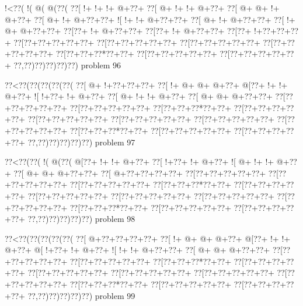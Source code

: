 \vbox{\vbox{\goo
\- !<\0??(\- !(\- @(\- @(\0??(
\0??[\- !+\- !+\- !+\- @+\0??+
\0??[\- @+\- !+\- !+\- @+\0??+
\0??[\- @+\- @+\- !+\- @+\0??+
\0??[\- @+\- !+\- @+\0??+\0??+
\- ![\- !+\- !+\- @+\0??+\0??+
\0??[\- @+\- !+\- @+\0??+\0??+
\0??[\- !+\- @+\- @+\0??+\0??+
\0??[\0??+\- !+\- @+\0??+\0??+
\0??[\0??+\- !+\- @+\0??+\0??+
\0??[\0??+\- !+\0??+\0??+\0??+
\0??[\0??+\0??+\0??+\0??+\0??+
\0??[\0??+\0??+\0??+\0??+\0??+
\0??[\0??+\0??+\0??+\0??+\0??+
\0??[\0??+\0??+\0??+\0??+\0??+
\0??[\0??+\0??+\0??*\0??+\0??+
\0??[\0??+\0??+\0??+\0??+\0??+
\0??[\0??+\0??+\0??+\0??+\0??+
\0??,\0??)\0??)\0??)\0??)\0??)
}
\hfil problem 96\hfil\break
}

\vbox{\vbox{\goo
\0??<\0??(\0??(\0??(\0??(\0??(
\0??[\- @+\- !+\0??+\0??+\0??+
\0??[\- !+\- @+\- @+\- @+\0??+
\- @[\0??+\- !+\- !+\- @+\0??+
\- ![\- !+\0??+\- !+\- @+\0??+
\0??[\- @+\- !+\- !+\- @+\0??+
\0??[\- @+\- @+\- @+\0??+\0??+
\0??[\0??+\0??+\0??+\0??+\0??+
\0??[\0??+\0??+\0??+\0??+\0??+
\0??[\0??+\0??+\0??*\0??+\0??+
\0??[\0??+\0??+\0??+\0??+\0??+
\0??[\0??+\0??+\0??+\0??+\0??+
\0??[\0??+\0??+\0??+\0??+\0??+
\0??[\0??+\0??+\0??+\0??+\0??+
\0??[\0??+\0??+\0??+\0??+\0??+
\0??[\0??+\0??+\0??*\0??+\0??+
\0??[\0??+\0??+\0??+\0??+\0??+
\0??[\0??+\0??+\0??+\0??+\0??+
\0??,\0??)\0??)\0??)\0??)\0??)
}
\hfil problem 97\hfil\break
}

\vbox{\vbox{\goo
\0??<\0??(\0??(\- !(\- @(\0??(
\- @[\0??+\- !+\- !+\- @+\0??+
\0??[\- !+\0??+\- !+\- @+\0??+
\- ![\- @+\- !+\- !+\- @+\0??+
\0??[\- @+\- @+\- @+\0??+\0??+
\0??[\- @+\0??+\0??+\0??+\0??+
\0??[\0??+\0??+\0??+\0??+\0??+
\0??[\0??+\0??+\0??+\0??+\0??+
\0??[\0??+\0??+\0??+\0??+\0??+
\0??[\0??+\0??+\0??*\0??+\0??+
\0??[\0??+\0??+\0??+\0??+\0??+
\0??[\0??+\0??+\0??+\0??+\0??+
\0??[\0??+\0??+\0??+\0??+\0??+
\0??[\0??+\0??+\0??+\0??+\0??+
\0??[\0??+\0??+\0??+\0??+\0??+
\0??[\0??+\0??+\0??*\0??+\0??+
\0??[\0??+\0??+\0??+\0??+\0??+
\0??[\0??+\0??+\0??+\0??+\0??+
\0??,\0??)\0??)\0??)\0??)\0??)
}
\hfil problem 98\hfil\break
}

\vbox{\vbox{\goo
\0??<\0??(\0??(\0??(\0??(\0??(
\0??[\- @+\0??+\0??+\0??+\0??+
\0??[\- !+\- @+\- @+\- @+\0??+
\- @[\0??+\- !+\- !+\- @+\0??+
\- @[\- !+\0??+\- !+\- @+\0??+
\- ![\- !+\- !+\- @+\0??+\0??+
\0??[\- @+\- @+\- @+\0??+\0??+
\0??[\0??+\0??+\0??+\0??+\0??+
\0??[\0??+\0??+\0??+\0??+\0??+
\0??[\0??+\0??+\0??*\0??+\0??+
\0??[\0??+\0??+\0??+\0??+\0??+
\0??[\0??+\0??+\0??+\0??+\0??+
\0??[\0??+\0??+\0??+\0??+\0??+
\0??[\0??+\0??+\0??+\0??+\0??+
\0??[\0??+\0??+\0??+\0??+\0??+
\0??[\0??+\0??+\0??*\0??+\0??+
\0??[\0??+\0??+\0??+\0??+\0??+
\0??[\0??+\0??+\0??+\0??+\0??+
\0??,\0??)\0??)\0??)\0??)\0??)
}
\hfil problem 99\hfil\break
}


